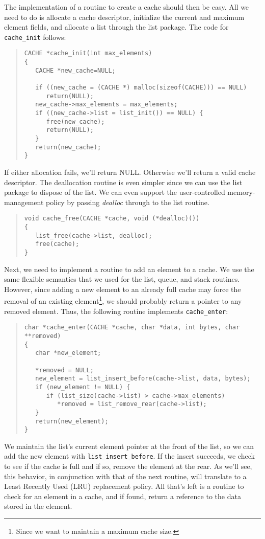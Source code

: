 \documentclass[fullpage,11pt]{article}
\begin{document}
\newpage
The implementation of a routine to create a cache should then be easy.  All we
need to do is allocate a cache descriptor, initialize the current and maximum
element fields, and allocate a list through the list package.  The code for
{\tt cache\_init} follows:
\begin{quote}
\begin{verbatim}
CACHE *cache_init(int max_elements)
{
   CACHE *new_cache=NULL;

   if ((new_cache = (CACHE *) malloc(sizeof(CACHE))) == NULL)
      return(NULL);
   new_cache->max_elements = max_elements;
   if ((new_cache->list = list_init()) == NULL) {
      free(new_cache);
      return(NULL);
   }
   return(new_cache);
}
\end{verbatim}
\end{quote}
If either allocation fails, we'll return NULL.  Otherwise we'll return a valid
cache descriptor.  The deallocation routine is even simpler since we can use
the list package to dispose of the list.  We can even support the
user-controlled memory-management policy by passing {\em dealloc} through to
the list routine.
\begin{quote}
\begin{verbatim}
void cache_free(CACHE *cache, void (*dealloc)())
{
   list_free(cache->list, dealloc);
   free(cache);
}
\end{verbatim}
\end{quote}

Next, we need to implement a routine to add an element to a cache.  We use the
same flexible semantics that we used for the list, queue, and stack routines.
However, since adding a new element to an already full cache may force the
removal of an existing element\footnote{Since we want to maintain a maximum
cache size.}, we should probably return a pointer to any removed element.
Thus, the following routine implements {\tt cache\_enter}:
\begin{quote}
\begin{verbatim}
char *cache_enter(CACHE *cache, char *data, int bytes, char **removed)
{
   char *new_element;

   *removed = NULL;
   new_element = list_insert_before(cache->list, data, bytes);
   if (new_element != NULL) {
      if (list_size(cache->list) > cache->max_elements)
         *removed = list_remove_rear(cache->list);
   }
   return(new_element);
}
\end{verbatim}
\end{quote}
We maintain the list's current element pointer at the front of the list, so we
can add the new element with {\tt list\_insert\_before}.  If the insert
succeeds, we check to see if the cache is full and if so, remove the element
at the rear.  As we'll see, this behavior, in conjunction with that of the
next routine, will translate to a Least Recently Used (LRU) replacement
policy.  All that's left is a routine to check for an element in a cache, and
if found, return a reference to the data stored in the element.
\end{document}
